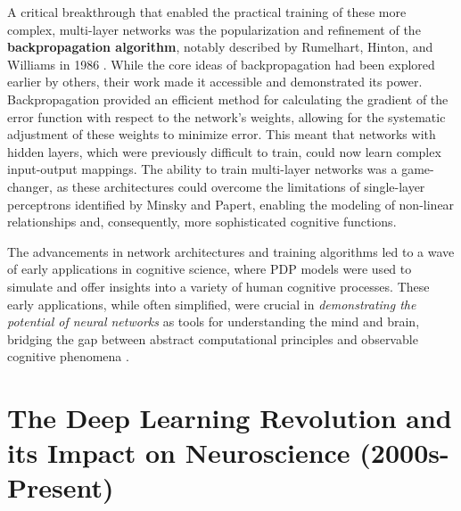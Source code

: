 A critical breakthrough that enabled the practical training of these more complex, multi-layer networks was the popularization and refinement of the \textbf{backpropagation algorithm}, notably described by Rumelhart, Hinton, and Williams in 1986 \cite{rumelhart1986learning}. While the core ideas of backpropagation had been explored earlier by others, their work made it accessible and demonstrated its power. Backpropagation provided an efficient method for calculating the gradient of the error function with respect to the network's weights, allowing for the systematic adjustment of these weights to minimize error. This meant that networks with hidden layers, which were previously difficult to train, could now learn complex input-output mappings. The ability to train multi-layer networks was a game-changer, as these architectures could overcome the limitations of single-layer perceptrons identified by Minsky and Papert, enabling the modeling of non-linear relationships and, consequently, more sophisticated cognitive functions.

The advancements in network architectures and training algorithms led to a wave of early applications in cognitive science, where PDP models were used to simulate and offer insights into a variety of human cognitive processes. These early applications, while often simplified, were crucial in \textit{demonstrating the potential of neural networks} as tools for understanding the mind and brain, bridging the gap between abstract computational principles and observable cognitive phenomena \cite{mcclelland1986parallel}.

\section{The Deep Learning Revolution and its Impact on Neuroscience (2000s-Present)}\label{sec:2000s}

